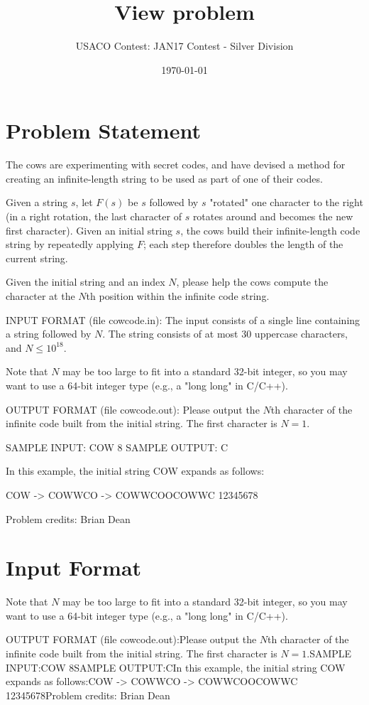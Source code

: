 \documentclass[12pt]{article}
\title{View problem}
\author{USACO Contest: JAN17 Contest - Silver Division}
\date{\today}
\begin{document}
\maketitle

\section*{Problem Statement}

The cows are experimenting with secret codes, and have devised a method for
creating an infinite-length string to be used as part of one of their codes.

Given a string $s$, let $F(s)$ be $s$ followed by $s$ "rotated" one character to
the right (in a right rotation, the last character of $s$ rotates around and
becomes the new first character).  Given an initial string $s$, the cows build
their infinite-length code string by repeatedly applying $F$; each step
therefore doubles the length of the current string.

Given the initial string and an index $N$, please help the cows compute the
character at the $N$th position within the infinite code string.

INPUT FORMAT (file cowcode.in):
The input consists of a single line containing a string followed by $N$.  The
string consists of at most 30 uppercase characters, and $N \leq 10^{18}$.

Note that $N$ may be too large to fit into a standard 32-bit integer, so you may
want to use a 64-bit integer type (e.g., a "long long" in C/C++).

OUTPUT FORMAT (file cowcode.out):
Please output the $N$th character of the infinite code built from the initial
string.  The first character is $N=1$.

SAMPLE INPUT:
COW 8
SAMPLE OUTPUT: 
C

In this example, the initial string COW expands as follows:

COW -> COWWCO -> COWWCOOCOWWC
                 12345678


Problem credits: Brian Dean



\section*{Input Format}
Note that $N$ may be too large to fit into a standard 32-bit integer, so you may
want to use a 64-bit integer type (e.g., a "long long" in C/C++).

OUTPUT FORMAT (file cowcode.out):Please output the $N$th character of the infinite code built from the initial
string.  The first character is $N=1$.SAMPLE INPUT:COW 8SAMPLE OUTPUT:CIn this example, the initial string COW expands as follows:COW -> COWWCO -> COWWCOOCOWWC
                 12345678Problem credits: Brian Dean
\end{document}
